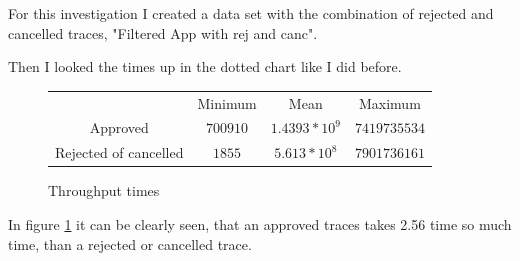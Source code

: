 For this investigation I created a data set with the combination of rejected and cancelled traces, "Filtered App with rej and canc".

Then I looked the times up in the dotted chart like I did before.


\begin{figure}[!htbp]
\centering
\begin{tabular}{|c|c|c|c|}
\hline
& Minimum & Mean & Maximum \\ \cline{1-4}
Approved& $700910$ & $1.4393*10^9$ & $ 7419735534$      \\ \cline{1-4}
Rejected of cancelled  & $1855$ & $5.613*10^8$ & $7901736161$       \\ \cline{1-4}
\end{tabular}
\caption{Throughput times}
\label{tab:Throughtimes}
\end{figure}

In figure \ref{tab:Throughtimes} it can be clearly seen, that an approved traces takes 2.56 time so much time, than a rejected or cancelled trace. 
